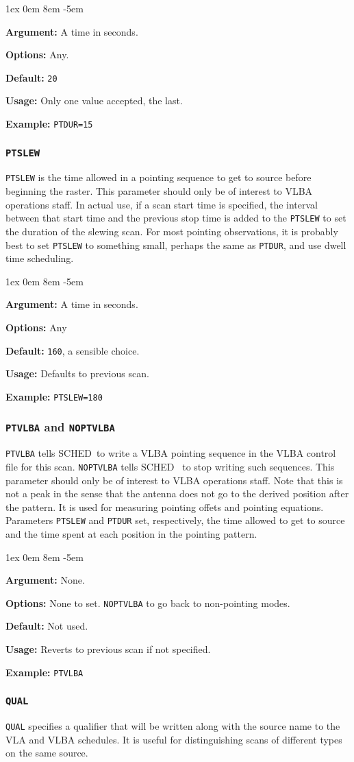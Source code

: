 \documentclass{report}
\newcommand{\schedb}{{\sc SCHED~}}
\newcommand{\rcwbox}[5]{
  \begin{list}{}{\parsep 1ex  \itemsep 0em
                 \leftmargin 8em  \itemindent -5em }
    \item {\bf Argument:} #1
    \item {\bf Options:}  #2
    \item {\bf Default:}  #3
    \item {\bf Usage:}    #4
    \item {\bf Example:}  #5
  \end{list}
}
\begin{document}
\rcwbox
{A time in seconds.}
{Any.}
{{\tt 20}}
{Only one value accepted, the last.}
{{\tt PTDUR=15}}


\subsubsection{\label{MP:PTSLEW}{\tt PTSLEW}}

{\tt PTSLEW} is the time allowed in a pointing sequence to get to
source before beginning the raster. This parameter should only be of
interest to VLBA operations staff. In actual use, if a scan start time
is specified, the interval between that start time and the previous
stop time is added to the {\tt PTSLEW} to set the duration of the
slewing scan.  For most pointing observations, it is probably best
to set {\tt PTSLEW} to something small, perhaps the same as {\tt PTDUR},
and use dwell time scheduling.

\rcwbox
{A time in seconds.}
{Any}
{{\tt 160}, a sensible choice.}
{Defaults to previous scan.}
{{\tt PTSLEW=180}}


\subsubsection{\label{MP:PTVLBA}{\tt PTVLBA} and {\tt NOPTVLBA}}

{\tt PTVLBA} tells \schedb to write a VLBA pointing sequence in
the VLBA control file for this scan. {\tt NOPTVLBA} tells \schedb
to stop writing such sequences.  This parameter should only be of
interest to VLBA operations staff. Note that this is not a peak in the
sense that the antenna does not go to the derived position after the
pattern. It is used for measuring pointing offets and pointing
equations. Parameters {\tt PTSLEW} and {\tt PTDUR} set, respectively,
the time allowed to get to source and the time spent at each position
in the pointing pattern.


\rcwbox
{None.}
{None to set. {\tt NOPTVLBA} to go back to non-pointing modes.}
{Not used.}
{Reverts to previous scan if not specified.}
{{\tt PTVLBA}}


\subsubsection{\label{MP:QUAL}{\tt QUAL}}

{\tt QUAL} specifies a qualifier that will be written along with the
source name to the VLA and VLBA schedules. It is useful for
distinguishing scans of different types on the same source.
\end{document}
